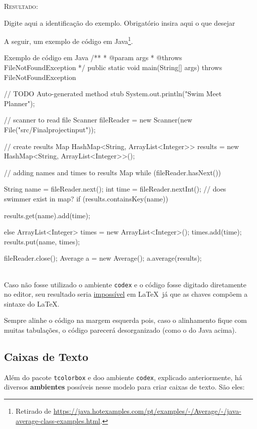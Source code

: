 \documentclass[a4paper,12pt,oneside,openright,extrafontsizes,openbib]{memoir}
\begin{document}
{\textsc{Resultado:}

\begin{codex}{Digite aqui a identificação do exemplo. Obrigatório}
	insira aqui o que desejar
\end{codex}

A seguir, um exemplo de código em Java\footnote{Retirado de \url{https://java.hotexamples.com/pt/examples/-/Average/-/java-average-class-examples.html}.}.

\begin{codex}{Exemplo de código em Java}
	/**
	* @param args
	* @throws FileNotFoundException
	*/
	public static void main(String[] args) throws FileNotFoundException {
		// TODO Auto-generated method stub
		System.out.println("Swim Meet Planner");
		
		// scanner to read file
		Scanner fileReader = new Scanner(new File("src/Finalprojectinput"));
		
		// create results Map
		HashMap<String, ArrayList<Integer>> results = new HashMap<String, ArrayList<Integer>>();
		
		// adding names and times to results Map
		while (fileReader.hasNext()) {
			String name = fileReader.next();
			int time = fileReader.nextInt();
			// does swimmer exist in map?
			if (results.containsKey(name)) {
				results.get(name).add(time);
				
			} else {
				ArrayList<Integer> times = new ArrayList<Integer>();
				times.add(time);
				results.put(name, times);
			}
		}
		fileReader.close();
		Average a = new Average();
		a.average(results);
	}
\end{codex}
\ \\

Caso não fosse utilizado o ambiente \verb|codex| e o código fosse digitado diretamente no editor, seu resultado seria \underline{impossível} em \LaTeX\ já que as chaves compõem a sintaxe do \LaTeX.


Sempre alinhe o código na margem esquerda pois, caso o alinhamento fique com muitas tabulações, o código parecerá desorganizado (como o do Java acima).

\subsection{Caixas de Texto}

Além do pacote \verb|tcolorbox| e doo ambiente \verb|codex|, explicado anteriormente, há diversos \textbf{ambientes} possíveis nesse modelo para criar caixas de texto. São eles:

}
\end{document}
